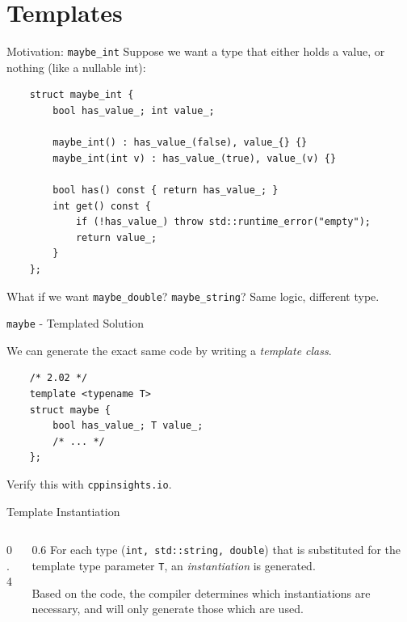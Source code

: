 \section{Templates}

\begin{frame}[fragile]{Motivation: \texttt{maybe\_int}}
  Suppose we want a type that either holds a value, or nothing (like a nullable int):
  \begin{verbatim}
    struct maybe_int {
        bool has_value_; int value_;

        maybe_int() : has_value_(false), value_{} {}
        maybe_int(int v) : has_value_(true), value_(v) {}

        bool has() const { return has_value_; }
        int get() const {
            if (!has_value_) throw std::runtime_error("empty");
            return value_;
        }
    };
  \end{verbatim}
  What if we want \texttt{maybe\_double}? \texttt{maybe\_string}? Same logic, different type.
\end{frame}

\begin{frame}[fragile]{\texttt{maybe} - Templated Solution}
  \begin{sqt:result}
    We can generate the exact same code by writing a \emph{template class}.
  \end{sqt:result}

  \begin{verbatim}
    /* 2.02 */
    template <typename T>
    struct maybe {
        bool has_value_; T value_;
        /* ... */
    };
  \end{verbatim}

  Verify this with \verb|cppinsights.io|. \\
\end{frame}

\begin{frame}[fragile]{Template Instantiation}
  \begin{columns}[T]
    \begin{column}{0.4\textwidth}
      
    \end{column}
    \begin{column}{0.6\textwidth}
      \vspace{1cm}
      For each type (\texttt{int, std::string, double}) that is substituted for
      the template type parameter \texttt{T}, 
      an \emph{instantiation} is generated.

      Based on the code, the compiler determines which instantiations are necessary,
      and will only generate those which are used.
    \end{column}
  \end{columns}
\end{frame}

